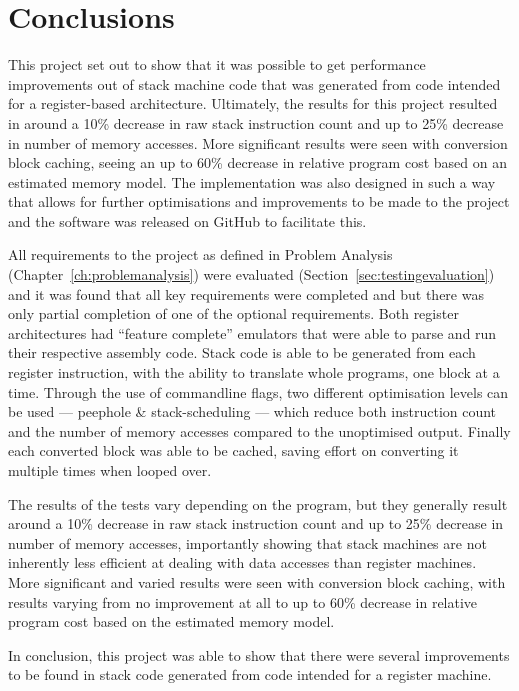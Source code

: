 \chapter{Conclusions}\label{ch:conclusions}
This project set out to show that it was possible to get performance
improvements out of stack machine code that was generated from code intended for
a register-based architecture. Ultimately, the results for this project resulted
in around a 10\% decrease in raw stack instruction count and up to 25\% decrease
in number of memory accesses. More significant results were seen with conversion
block caching, seeing an up to 60\% decrease in relative program cost based on
an estimated memory model. The implementation was also designed in such a way
that allows for further optimisations and improvements to be made to the
project and the software was released on GitHub to facilitate this.

All requirements to the project as defined in Problem Analysis
(Chapter~\ref{ch:problemanalysis}) were evaluated
(Section~\ref{sec:testingevaluation}) and it was found that all key requirements
were completed and but there was only partial completion of one of the optional
requirements. Both register architectures had ``feature complete'' emulators
that were able to parse and run their respective assembly code. Stack code is
able to be generated from each register instruction, with the ability to
translate whole programs, one block at a time. Through the use of commandline
flags, two different optimisation levels can be used --- peephole \&
stack-scheduling --- which reduce both instruction count and the number of
memory accesses compared to the unoptimised output.  Finally each converted
block was able to be cached, saving effort on converting it multiple times when
looped over.

The results of the tests vary depending on the program, but they generally
result around a 10\% decrease in raw stack instruction count and up to 25\%
decrease in number of memory accesses, importantly showing that stack machines
are not inherently less efficient at dealing with data accesses than register
machines. More significant and varied results were seen with conversion block
caching, with results varying from no improvement at all to up to 60\% decrease
in relative program cost based on the estimated memory model.

In conclusion, this project was able to show that there were several
improvements to be found in stack code generated from code intended for a
register machine.

